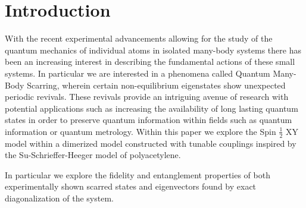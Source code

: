 \chapter{Introduction}

With the recent experimental advancements allowing for the study of the quantum mechanics of individual atoms in isolated many-body systems there has been an increasing interest in describing the fundamental actions of these small systems. In particular we are interested in a phenomena called Quantum Many-Body Scarring, wherein certain non-equilibrium eigenstates show unexpected periodic revivals. These revivals provide an intriguing avenue of research with potential applications such as increasing the availability of long lasting quantum states in order to preserve quantum information within fields such as quantum information or quantum metrology.
Within this paper we explore the Spin $\frac{1}{2}$ XY model within a dimerized model constructed with tunable couplings inspired by the Su-Schrieffer-Heeger model of polyacetylene. 

In particular we explore the fidelity and entanglement properties of both experimentally shown scarred states and eigenvectors found by exact diagonalization of the system.  


